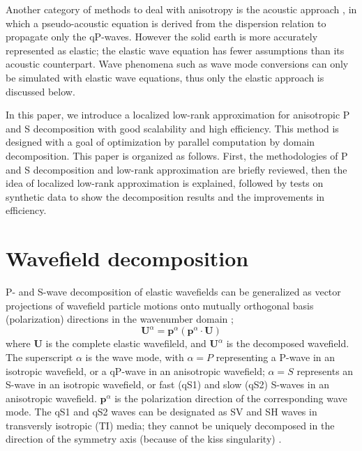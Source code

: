 \documentclass[manuscript,ulem,graphix,revised]{geophysics}
\begin{document}
Another category of methods to deal with anisotropy is the acoustic approach \citep{alkhalifah98,alkhalifah00}, in which a pseudo-acoustic equation is derived from the dispersion relation to propagate only the qP-waves. However the solid earth is more accurately represented as elastic; the elastic wave equation has fewer assumptions than its acoustic counterpart. Wave phenomena such as wave mode conversions can only be simulated with elastic wave equations, thus only the elastic approach is discussed below.

In this paper, we introduce a localized low-rank approximation for anisotropic P and S decomposition with good scalability and high efficiency. This method is designed with a goal of optimization by parallel computation by domain decomposition. 
This paper is organized as follows. First, the methodologies of P and S decomposition and low-rank approximation are briefly reviewed, then the idea of localized low-rank approximation is explained, followed by tests on synthetic data to show the decomposition results and the improvements in efficiency. 


\section {Wavefield decomposition}
\indent\indent
P- and S-wave decomposition of elastic wavefields can be generalized as vector projections of wavefield particle motions onto mutually orthogonal basis (polarization) directions in the wavenumber domain \citep{zhang10};
\begin{equation}
\boldsymbol{U}^\alpha=\boldsymbol{p}^\alpha(\boldsymbol{p}^\alpha\cdot\boldsymbol{U})
\label{eqn:dec}
\end{equation}
where $\boldsymbol{U}$ is the complete elastic wavefileld, and ${\boldsymbol{U}}^\alpha$ is the decomposed wavefield. The superscript $\alpha$ is the wave mode, with $\alpha=P$ representing a P-wave in an isotropic wavefield, or a qP-wave in an anisotropic wavefield; $\alpha=S$ represents an S-wave in an isotropic wavefield, or fast (qS1) and slow (qS2) S-waves in an anisotropic wavefield. $\boldsymbol{p}^\alpha$ is the polarization direction of the corresponding wave mode. 
The qS1 and qS2 waves can be designated as SV and SH waves in transversly isotropic (TI) media; they cannot be uniquely decomposed in the direction of the symmetry axis (because of the kiss singularity)
\citep{zhang10,Sripanich16,cheng14}.
\end{document}
